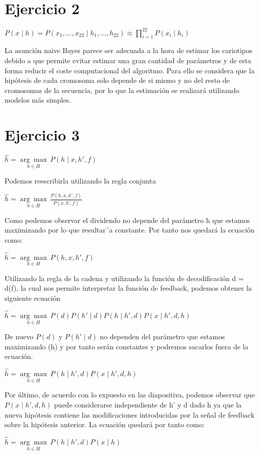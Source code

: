 \documentclass[10pt,a4paper]{article}
\begin{document}
	\section{Ejercicio 2}
	\begin{center}
		${P(x \mid h) = P(x_{1},...,x_{22} \mid h_{1},...,h_{22}) \approx
		\prod_{i=1}^{22}P(x_{i} \mid h_{i})}$
	\end{center}
	La asunción naive Bayes parece ser adecuada a la hora de estimar los cariotipos
	debido a que permite evitar estimar una gran cantidad de parámetros y de esta forma reducir el coste computacional del algoritmo. Para ello se considera que
	la hipótesis de cada cromosoma solo depende de si mismo y no del resto de
	cromosomas de la secuencia, por lo que la estimación se realizará utilizando
	modelos más simples.
	\newpage
	\section{Ejercicio 3}
	\begin{center}
		${\hat{h} = \underset{h \in H}{\arg\max}\,{P(h \mid x,h',f)}}$
	\end{center}
	Podemos reescribirla utilizando la regla conjunta
	\begin{center}
		${\hat{h} = \underset{h \in H}{\arg\max}\,\frac{P(h,x,h',f)}{P(x,h',f)}}$
	\end{center}
	Como podemos observar el dividendo no depende del parámetro h que estamos
	maximizando por lo que resultar´a constante. Por tanto nos quedará la ecuación
	como:
	\begin{center}
		${\hat{h} = \underset{h \in H}{\arg\max}\,{P(h,x,h',f)}}$
	\end{center}
	Utilizando la regla de la cadena y utilizando la función de decodificación d =
	d(f), la cual nos permite interpretar la función de feedback, podemos obtener
	la siguiente ecuación
	\begin{center}
		${\hat{h} = \underset{h \in H}{\arg\max}\,
			{P(d)P(h' \mid d)P(h \mid h', d)P(x \mid h',d,h)}}$
	\end{center}
	De nuevo $P(d)$ y $P(h' \mid d)$ no dependen del parámetro que estamos maximizando	(h) y por tanto serán constantes y podremos sacarlos fuera de la ecuación.
	\begin{center}
		${\hat{h} = \underset{h \in H}{\arg\max}\,
			{P(h \mid h', d)P(x \mid h',d,h)}}$
	\end{center}
	Por último, de acuerdo con lo expuesto en las diapositiva, podemos observar que $P(x \mid h',d,h)$ puede considerarse independiente de h’ y d dado h ya que la nueva hipótesis contiene las modificaciones introducidas por la señal de feedback sobre la hipótesis anterior. La ecuación quedará por tanto como:
	\begin{center}
		${\hat{h} = \underset{h \in H}{\arg\max}\,
			{P(h \mid h',d)P(x \mid h)}}$
	\end{center}
\end{document}
